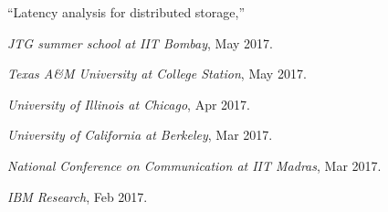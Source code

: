 \documentclass[11pt]{article}
\newenvironment{innerlist}[1][\enskip\textbullet]%
        {\begin{compactenum}[#1]}{\end{compactenum}}
\newcommand{\blankline}{\quad\pagebreak[2]}
\begin{document}
``Latency analysis for distributed storage,''
\begin{innerlist}
\item[] \textit{JTG summer school at IIT Bombay},  May  2017.
\item[] \textit{Texas A\&M University at College Station},  May  2017.
\item[] \textit{University of Illinois at Chicago},  Apr  2017.
\item[] \textit{University of California at Berkeley},  Mar  2017.
\item[] \textit{National Conference on Communication at IIT Madras},  Mar  2017.
\item[] \textit{IBM Research},  Feb  2017.\\
 \end{innerlist}
  \blankline
  
\end{document}

